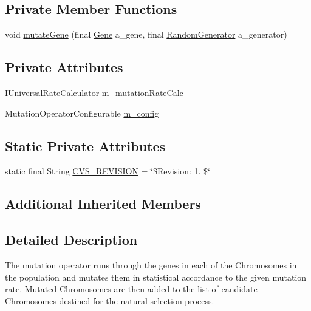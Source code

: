 \subsection*{Private Member Functions}
\begin{DoxyCompactItemize}
\item 
void \hyperlink{classorg_1_1jgap_1_1impl_1_1_mutation_operator_a178169eac1a0fc4d9fa105567b4f7c5f}{mutate\-Gene} (final \hyperlink{interfaceorg_1_1jgap_1_1_gene}{Gene} a\-\_\-gene, final \hyperlink{interfaceorg_1_1jgap_1_1_random_generator}{Random\-Generator} a\-\_\-generator)
\end{DoxyCompactItemize}
\subsection*{Private Attributes}
\begin{DoxyCompactItemize}
\item 
\hyperlink{interfaceorg_1_1jgap_1_1_i_universal_rate_calculator}{I\-Universal\-Rate\-Calculator} \hyperlink{classorg_1_1jgap_1_1impl_1_1_mutation_operator_a7159d9d04d2eec98514a4756411b1699}{m\-\_\-mutation\-Rate\-Calc}
\item 
Mutation\-Operator\-Configurable \hyperlink{classorg_1_1jgap_1_1impl_1_1_mutation_operator_a08cdb3d1a82a3fd66aa080043a20b0b2}{m\-\_\-config}
\end{DoxyCompactItemize}
\subsection*{Static Private Attributes}
\begin{DoxyCompactItemize}
\item 
static final String \hyperlink{classorg_1_1jgap_1_1impl_1_1_mutation_operator_ab837b187fad3cad5dd892f7e3a793847}{C\-V\-S\-\_\-\-R\-E\-V\-I\-S\-I\-O\-N} = \char`\"{}\$Revision\-: 1. \$\char`\"{}
\end{DoxyCompactItemize}
\subsection*{Additional Inherited Members}


\subsection{Detailed Description}
The mutation operator runs through the genes in each of the Chromosomes in the population and mutates them in statistical accordance to the given mutation rate. Mutated Chromosomes are then added to the list of candidate Chromosomes destined for the natural selection process.


